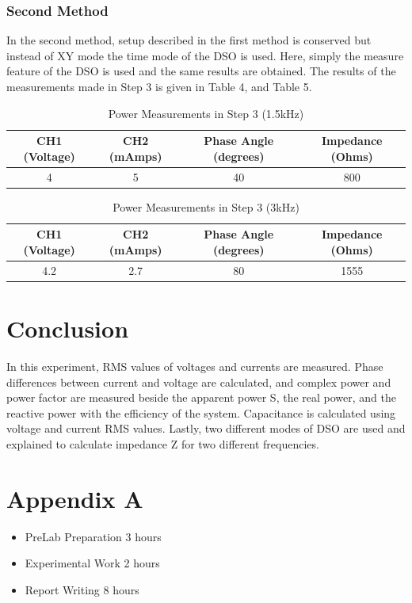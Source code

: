 \documentclass[letterpaper,12pt]{article}
\begin{document}
\subsubsection{Second Method}
In the second method, setup described in the first method is conserved but instead of XY mode the time mode of the DSO is used. Here, simply the measure feature of the DSO is used and the same results are obtained. The results of the measurements made in Step 3 is given in Table 4, and Table 5.

\begin{table}[H]
    \begin{center}
        \caption{Power Measurements in Step 3 (1.5kHz)}
        \vspace{2mm}
        \begin{tabular}{||c | c | c | c ||} 
            \hline
            CH1 (Voltage) & CH2 (mAmps) & Phase Angle (degrees) & Impedance (Ohms)   \\ [0.5ex] 
            \hline\hline
            4 & 5  & 40    & 800  \\ 
            \hline
        \end{tabular}
\end{center}
\end{table}

\begin{table}[H]
    \begin{center}
        \caption{Power Measurements in Step 3 (3kHz)}
        \vspace{2mm}
        \begin{tabular}{||c | c | c | c ||} 
            \hline
            CH1 (Voltage) & CH2 (mAmps) & Phase Angle (degrees) & Impedance (Ohms)   \\ [0.5ex] 
            \hline\hline
            4.2 & 2.7  & 80    & 1555   \\ 
            \hline
        \end{tabular}
\end{center}
\end{table}

\section{Conclusion}
In this experiment, RMS values of voltages and currents are measured. Phase differences between current and voltage are calculated, and complex power and power factor are measured beside the apparent power S, the real power, and the reactive power with the efficiency of the system. Capacitance is calculated using voltage and current RMS values. Lastly, two different modes of DSO are used and explained to calculate impedance Z for two different frequencies.


\section*{Appendix A}
\begin{itemize}
    \item PreLab Preparation 3 hours
    \item Experimental Work 2  hours
    \item Report Writing 8 hours
\end{itemize}
\end{document}
